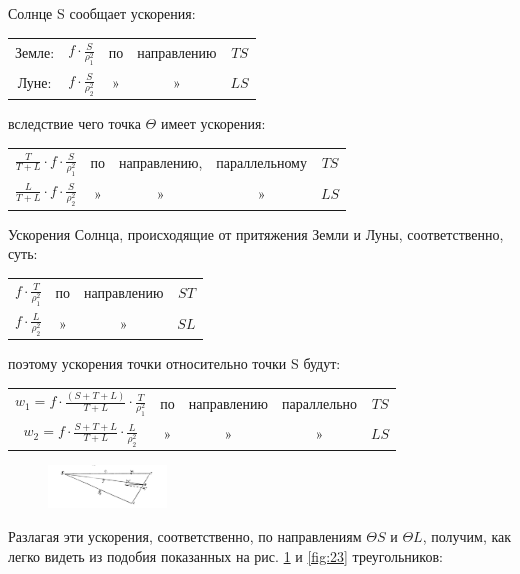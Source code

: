 \documentclass[a4paper,12pt]{article}
\begin{document}
Солнце S сообщает ускорения:
\begin{table}[H]
	\centering
	\begin{tabular}{ccccc} 
		Земле: & $f\cdot \frac S{\rho_1^2}$& по & направлению & $TS$ \\
		Луне: & $f\cdot \frac S{\rho_2^2}$ & » & » & $LS$\\
	\end{tabular}
\end{table}
вследствие чего точка $\Theta$ имеет ускорения:
\begin{table}[H]
	\centering
	\begin{tabular}{ccccc} 
		$\frac T{T+L}\cdot f \cdot \frac S{\rho_1^2}$ & по & направлению, & параллельному & $TS$ \\
		$\frac L{T+L}\cdot f \cdot \frac S{\rho_2^2}$ & » & » & » & $LS$ \\
	\end{tabular}
\end{table}
Ускорения Солнца, происходящие от притяжения Земли и Луны, соответственно, суть:
\begin{table}[H]
	\centering
	\begin{tabular}{cccc} 
	$f\cdot \frac T{\rho_1^2}$ & по & направлению & $ST$ \\
	 $f\cdot \frac L{\rho_2^2}$& » & » & $SL$ \\
	\end{tabular}
\end{table}
поэтому ускорения точки относительно точки S будут:
\begin{table}[H]
	\centering
	\begin{tabular}{ccccc} 
		$w_1=f\cdot \frac{(S+T+L)}{T+L} \cdot \frac T{\rho_1^2}$ & по & направлению & параллельно & $TS$ \\
			$w_2=f\cdot \frac{S+T+L}{T+L} \cdot \frac L{\rho_2^2}$ & » & » & » & $LS$ \\
	\end{tabular}
\end{table}

\begin{figure}
		\caption{} 
	\centering
	\includegraphics[width=0.28\textwidth]{22.png}
	\label{fig:22}	
\end{figure}
Разлагая эти ускорения, соответственно, по направлениям $\Theta S$ и $\Theta L$, получим, как легко видеть из подобия показанных на рис. \ref{fig:22} и \ref{fig:23} треугольников:
\end{document}
